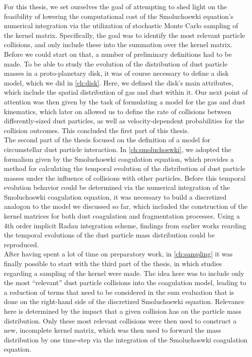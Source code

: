 For this thesis, we set ourselves the goal of attempting to shed light on the feasibility of
lowering the computational cost of the Smoluchoswki equation's numerical integration
via the utilization of stochastic Monte Carlo sampling of the kernel matrix. Specifically, 
the goal was to identify the most relevant particle collisions, and only include these into the 
summation over the kernel matrix. \\

Before we could start on that, a number of preliminary definitions had to be made. To be able to 
study the evolution of the distribution of dust particle masses in a proto-planetary disk, it was 
of course necessary to define a disk model, which we did in \cref{ch:disk}. Here, we defined the 
disk's main attributes, which include the spatial distribution of gas and dust within it. 
Our next point of attention was then given by the task of formulating a model for the gas and dust
kinematics, which later on allowed us to define the rate of collisions between differently-sized 
dust particles, as well as velocity-dependent probabilities for the collision outcomes. This 
concluded the first part of this thesis. \\

The second part of the thesis focused on the definition of a model for circumstellar dust particle
interaction. In \cref{ch:smoluchoswki}, we adopted the formalism given by the Smoluchoswki 
coagulation equation, which provides a method for calculating the temporal evolution of the 
distribution of dust particle masses under the influence of collisions with other particles. Before 
this temporal evolution behavior could be determined via the numerical integration of the 
Smoluchoswki coagulation equation, it was necessary to build a discretized analogon to the model we 
discussed so far, which included the construction of the kernel matrices for both dust coagulation 
and fragmentation processes. 
Using a 4th order implicit Radau integration scheme, findings from earlier works rearding the 
temporal evolutions of the dust particle mass
distribution could be reproduced. \\

After having spent a lot of time on preparatory work, in \cref{ch:sampling} it was finally 
possible to start with the third part of
the thesis, in which studies regarding a sampling of the kernel were made. The idea here was to 
include only the most ``relevant'' dust particle collisions into the coagulation model, leading to a 
reduction of terms that need to be considered in the sum evaluation that is done on the
right-hand side of the discretized Smoluchoswki equation. Relevance here is 
determined by the impact that a given collision has on the particle mass distribution. 
Only these most relevant collisions were then used to construct a new, incomplete kernel matrix,
which was then used to forward the mass distribution by one time-step via the integration of the 
Smoluchoswki coagulation equation. \\

